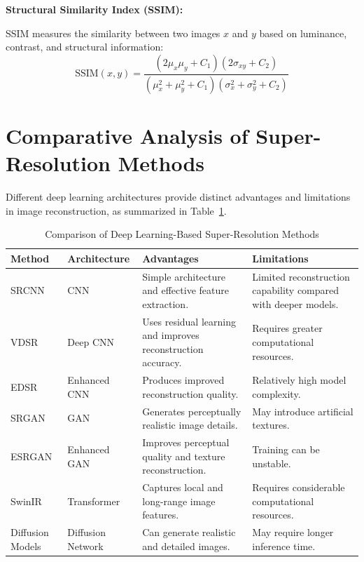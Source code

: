 \documentclass[conference]{IEEEtran}
\begin{document}
\textbf{Structural Similarity Index (SSIM):}

SSIM measures the similarity between two images $x$ and $y$ based on luminance, contrast, and structural information:
\begin{equation}
\mathrm{SSIM}(x,y) = \frac{(2\mu_x\mu_y + C_1)(2\sigma_{xy} + C_2)}{(\mu_x^2 + \mu_y^2 + C_1)(\sigma_x^2 + \sigma_y^2 + C_2)}
\end{equation}

\section{Comparative Analysis of Super-Resolution Methods}

Different deep learning architectures provide distinct advantages and limitations in image reconstruction, as summarized in Table~\ref{tab:comparison}.

\begin{table}[!t]
\centering
\caption{Comparison of Deep Learning-Based Super-Resolution Methods}
\label{tab:comparison}
\begin{tabular}{p{2.8cm} p{2.8cm} p{5.0cm} p{5.0cm}}
\toprule
\textbf{Method} & \textbf{Architecture} & \textbf{Advantages} & \textbf{Limitations} \\
\midrule
SRCNN \cite{dong2015srcnn} & CNN & Simple architecture and effective feature extraction. & Limited reconstruction capability compared with deeper models. \\
VDSR \cite{kim2016vdsr} & Deep CNN & Uses residual learning and improves reconstruction accuracy. & Requires greater computational resources. \\
EDSR \cite{lim2017edsr} & Enhanced CNN & Produces improved reconstruction quality. & Relatively high model complexity. \\
SRGAN \cite{ledig2017srgan} & GAN & Generates perceptually realistic image details. & May introduce artificial textures. \\
ESRGAN \cite{wang2018esrgan} & Enhanced GAN & Improves perceptual quality and texture reconstruction. & Training can be unstable. \\
SwinIR \cite{liang2021swinir} & Transformer & Captures local and long-range image features. & Requires considerable computational resources. \\
Diffusion Models \cite{li2022srdiff, yue2023resshift} & Diffusion Network & Can generate realistic and detailed images. & May require longer inference time. \\
\bottomrule
\end{tabular}
\end{table}
\end{document}
